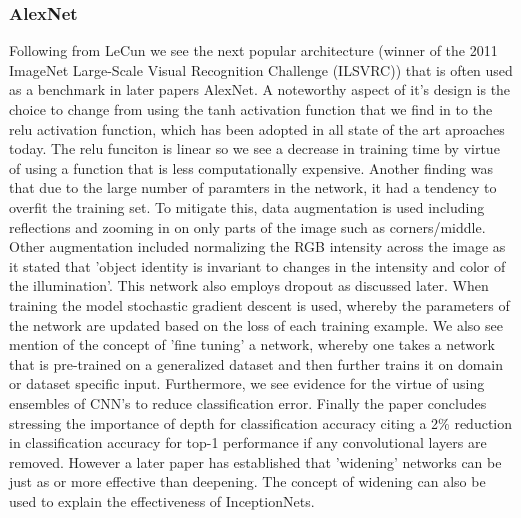   \subsubsection{AlexNet}
    Following from LeCun we see the next popular architecture (winner of the 2011 ImageNet Large-Scale Visual Recognition Challenge (ILSVRC)) that is often used as a benchmark in later papers AlexNet\citep{Krizhevsky}. A noteworthy aspect of it's design is the choice to change from using the tanh activation function that we find in \citep{leCun1998} to the relu activation function, which has been adopted in all state of the art aproaches today. The relu funciton is linear so we see a decrease in training time by virtue of using a function that is less computationally expensive. Another finding was that due to the large number of paramters in the network, it had a tendency to overfit the training set. To mitigate this, data augmentation is used including reflections and zooming in on only parts of the image such as corners/middle. Other augmentation included normalizing the RGB intensity across the image as it stated that 'object identity is invariant to changes in the intensity and color of the illumination'. This network also employs dropout as discussed later. When training the model stochastic gradient descent is used, whereby the parameters of the network are updated based on the loss of each training example. We also see mention of the concept of 'fine tuning' a network, whereby one takes a network that is pre-trained on a generalized dataset and then further trains it on domain or dataset specific input. Furthermore, we see evidence for the virtue of using ensembles of CNN's to reduce classification error. Finally the paper concludes stressing the importance of depth for classification accuracy citing a 2\% reduction in classification accuracy for top-1 performance if any convolutional layers are removed. However a later paper \citep{Zagoruyko} has established that 'widening' networks can be just as or more effective than deepening. The concept of widening can also be used to explain the effectiveness of InceptionNets.

